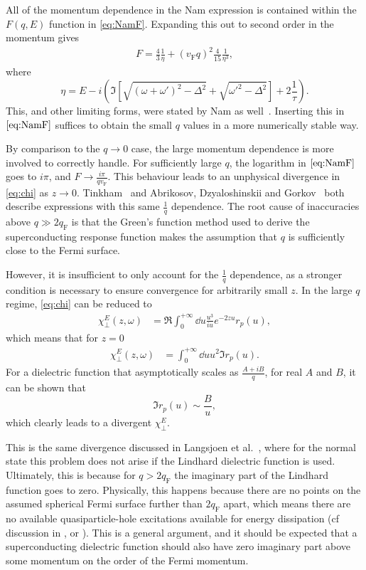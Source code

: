 \documentclass{article}
\newcommand{\vf}{v_{\mathrm{F}}}
\begin{document}
All of the momentum dependence in the Nam expression is contained within the $F(q, E)$ function in \eqref{eq:NamF}.
Expanding this out to second order in the momentum gives
\begin{align}
	F = \frac43 \frac{1}{\eta} + (\vf q)^2\frac{4}{15} \frac{1}{\eta^3},
\end{align}
where
\begin{equation}
	\eta = E - i \left(\Im[\sqrt{(\omega + \omega')^2 - \Delta^2} + \sqrt{\omega'^2 - \Delta^2}] + 2 \frac{1}{\tau} \right).
\end{equation}
This, and other limiting forms, were stated by Nam as well~\cite{Nam1967}.
Inserting this in $\eqref{eq:NamF}$ suffices to obtain the small $q$ values in a more numerically stable way.

By comparison to the $q \rightarrow 0$ case, the large momentum dependence is more involved to correctly handle.
For sufficiently large $q$, the logarithm in $\eqref{eq:NamF}$ goes to $i \pi$, and $F \rightarrow \frac{i \pi}{q \vf}$.
This behaviour leads to an unphysical divergence in \eqref{eq:chi} as $z \rightarrow 0$.
Tinkham~\cite{Tinkham} and Abrikosov, Dzyaloshinskii and Gorkov~\cite{AGD} both describe expressions with this same $\frac{1}{q}$ dependence.
The root cause of inaccuracies above $q \gg 2 q_{\mathrm{F}}$ is that the Green's function method used to derive the superconducting response function makes the assumption that $q$ is sufficiently close to the Fermi surface.

However, it is insufficient to only account for the $\frac{1}{q}$ dependence, as a stronger condition is necessary to ensure convergence for arbitrarily small $z$.
In the large $q$ regime, \eqref{eq:chi} can be reduced to
\begin{align}
	\chi_\perp^E(z, \omega) &= \Re \int_0^{+\infty} \dd{u} \frac{u^3}{i u} e^{-2 z u} r_p(u),
\end{align}
which means that for $z = 0$
\begin{align}
	\chi_\perp^E(z, \omega) &= \int_0^{+\infty} \dd{u} u^2 \Im r_p(u).
\end{align}
For a dielectric function that asymptotically scales as $\frac{A + i B}{q}$, for real $A$ and $B$, it can be shown that
\begin{equation}
	\Im r_p(u) \sim \frac{B}{u},
\end{equation}
which clearly leads to a divergent $\chi_\perp^E$.

This is the same divergence discussed in Langsjoen et al.~\cite{QubitRelax}, where for the normal state this problem does not arise if the Lindhard dielectric function is used.
Ultimately, this is because for $q > 2 q_{\mathrm{F}}$ the imaginary part of the Lindhard function goes to zero.
Physically, this happens because there are no points on the assumed spherical Fermi surface further than $2 q_{\mathrm{F}}$ apart, which means there are no available quasiparticle-hole excitations available for energy dissipation (cf discussion in \cite{AGD}, \cite{FetterWalecka} or \cite{SolyomV3}).
This is a general argument, and it should be expected that a superconducting dielectric function should also have zero imaginary part above some momentum on the order of the Fermi momentum.
\end{document}
